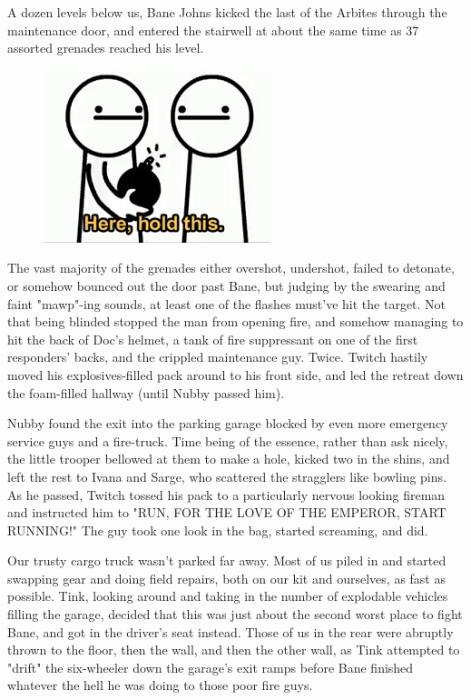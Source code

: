A dozen levels below us, Bane Johns kicked the last of the Arbites through the maintenance door, and entered the stairwell at about the same time as 37 assorted grenades reached his level.

\begin{figure}
	\begin{center}
		\includegraphics[width=\figwidth]{pics/19/48.png}
	\end{center}
\end{figure}
The vast majority of the grenades either overshot, undershot, failed to detonate, or somehow bounced out the door past Bane, but judging by the swearing and faint "mawp"-ing sounds, at least one of the flashes must've hit the target. 
Not that being blinded stopped the man from opening fire, and somehow managing to hit the back of Doc's helmet, a tank of fire suppressant on one of the first responders' backs, and the crippled maintenance guy. 
Twice. 
Twitch hastily moved his explosives-filled pack around to his front side, and led the retreat down the foam-filled hallway (until Nubby passed him).

Nubby found the exit into the parking garage blocked by even more emergency service guys and a fire-truck. 
Time being of the essence, rather than ask nicely, the little trooper bellowed at them to make a hole, kicked two in the shins, and left the rest to Ivana and Sarge, who scattered the stragglers like bowling pins. 
As he passed, Twitch tossed his pack to a particularly nervous looking fireman and instructed him to "RUN, FOR THE LOVE OF THE EMPEROR, START RUNNING!" The guy took one look in the bag, started screaming, and did.

Our trusty cargo truck wasn't parked far away. 
Most of us piled in and started swapping gear and doing field repairs, both on our kit and ourselves, as fast as possible. 
Tink, looking around and taking in the number of explodable vehicles filling the garage, decided that this was just about the second worst place to fight Bane, and got in the driver's seat instead. 
Those of us in the rear were abruptly thrown to the floor, then the wall, and then the other wall, as Tink attempted to "drift" the six-wheeler down the garage's exit ramps before Bane finished whatever the hell he was doing to those poor fire guys. 


